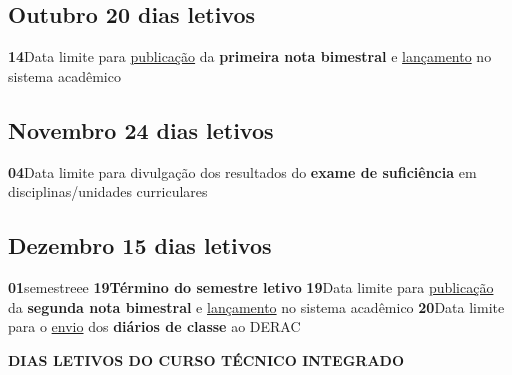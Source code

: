 \documentclass[thesis]{hmcposter}
\begin{document}
\begin{poster}
\subsection{Outubro \hfill 20 dias letivos}\textbf{14}\qquad Data limite para \underline{publicação} da \textbf{primeira nota bimestral} e \underline{lançamento} no sistema acadêmico \newline \null\subsection{Novembro \hfill 24 dias letivos}\textbf{04}\qquad Data limite para divulgação dos resultados do \textbf{exame de suficiência} em disciplinas/unidades curriculares \newline \null\subsection{Dezembro \hfill 15 dias letivos}\textbf{01}\qquad semestreee \newline \null\textbf{19}\qquad \textbf{Término do semestre letivo} \newline \null\textbf{19}\qquad Data limite para \underline{publicação} da \textbf{segunda nota bimestral} e \underline{lançamento} no sistema acadêmico \newline \null\textbf{20}\qquad Data limite para o \underline{envio} dos \textbf{diários de classe} ao DERAC \newline \null\newpage
~
\vfill
\begin{center}
\large \textbf{DIAS LETIVOS DO CURSO TÉCNICO INTEGRADO}
\newline
\null
\newline
\begin{table}
\centering
{}
\end{table}
\newline
\null
\newline

\end{center}
\end{poster}
\end{document}
